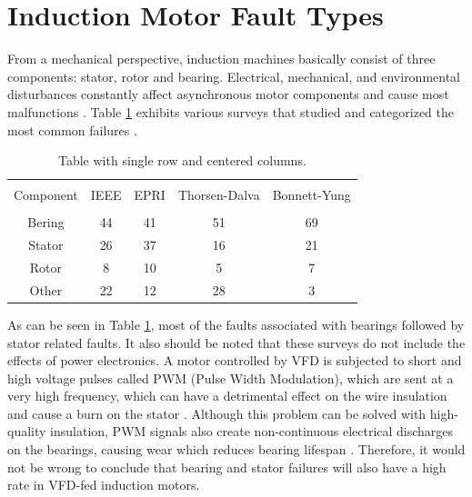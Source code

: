 \section{Induction Motor Fault Types}

From a mechanical perspective, induction machines basically consist of three components: stator, rotor and bearing. Electrical, mechanical, and environmental disturbances constantly affect asynchronous motor components and cause most malfunctions \cite{bonnet2010}. Table \ref{Table2.1} exhibits various surveys that studied and categorized the most common failures \cite{motor1985report,albrecht1986assessment,albrecht1987assessment,thorsen1995survey,bonnett2008increased}. 

\begin{table}[h]
	{\setlength{\tabcolsep}{12pt}
		\caption{Table with single row and centered columns.}
		\begin{center}
			\vspace{-6mm}
			\begin{tabular}{ccccc}
				\hline \\[-2.45ex] \hline \\[-2.1ex]
				Component & IEEE & EPRI & Thorsen-Dalva & Bonnett-Yung \\
				\hline \\[-1.8ex]
				Bering & 44 & 41 & 51 & 69 \\
				Stator & 26 & 37  & 16 & 21\\
				Rotor & 8 & 10 & 5 & 7 \\
				Other & 22 & 12  & 28 & 3\\
				\hline
			\end{tabular}
			\vspace{-6mm}
		\end{center}
		\label{Table2.1}}
\end{table}

As can be seen in Table \ref{Table2.1}, most of the faults associated with bearings followed by stator related faults. It also should be noted that these surveys do not include the effects of power electronics. A motor controlled by VFD is subjected to short and high voltage pulses called PWM (Pulse Width Modulation), which are sent at a very high frequency, which can have a detrimental effect on the wire insulation and cause a burn on the stator \cite{gunnar2016}. Although this problem can be solved with high-quality insulation, PWM signals also create non-continuous electrical discharges on the bearings, causing wear which reduces bearing lifespan \cite{trigeassou2013electrical}. Therefore, it would not be wrong to conclude that bearing and stator failures will also have a high rate in VFD-fed induction motors.

